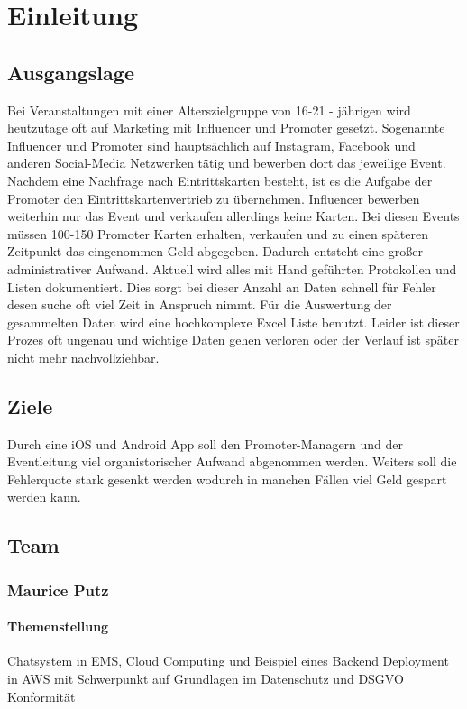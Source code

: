 \chapter{Einleitung}


\section{Ausgangslage}
Bei Veranstaltungen mit einer Alterszielgruppe von 16-21 - jährigen wird heutzutage oft auf Marketing mit Influencer und Promoter gesetzt. 
Sogenannte Influencer und Promoter sind hauptsächlich auf Instagram, Facebook und anderen Social-Media Netzwerken tätig und bewerben dort das jeweilige Event. 
Nachdem eine Nachfrage nach Eintrittskarten besteht, ist es die Aufgabe der Promoter den Eintrittskartenvertrieb zu übernehmen. 
Influencer bewerben weiterhin nur das Event und verkaufen allerdings keine Karten. 
Bei diesen Events müssen 100-150 Promoter Karten erhalten, verkaufen und zu einen späteren Zeitpunkt das eingenommen Geld abgegeben. Dadurch entsteht eine großer 
administrativer Aufwand. Aktuell wird alles mit Hand geführten Protokollen und Listen dokumentiert. Dies sorgt bei dieser Anzahl an Daten schnell für Fehler desen suche
oft viel Zeit in Anspruch nimmt. Für die Auswertung der gesammelten Daten wird eine hochkomplexe Excel Liste benutzt. Leider ist dieser Prozes oft ungenau und wichtige 
Daten gehen verloren oder der Verlauf ist später nicht mehr nachvollziehbar. 

\section{Ziele}
Durch eine iOS und Android App soll den Promoter-Managern und der Eventleitung viel organistorischer Aufwand abgenommen werden. Weiters soll die Fehlerquote stark gesenkt werden
wodurch in manchen Fällen viel Geld gespart werden kann. 

\newpage
\section{Team}
\subsection{Maurice Putz}
\subsubsection{Themenstellung}
Chatsystem in EMS, Cloud Computing und Beispiel eines Backend Deployment in AWS mit Schwerpunkt auf Grundlagen im Datenschutz und DSGVO Konformität

